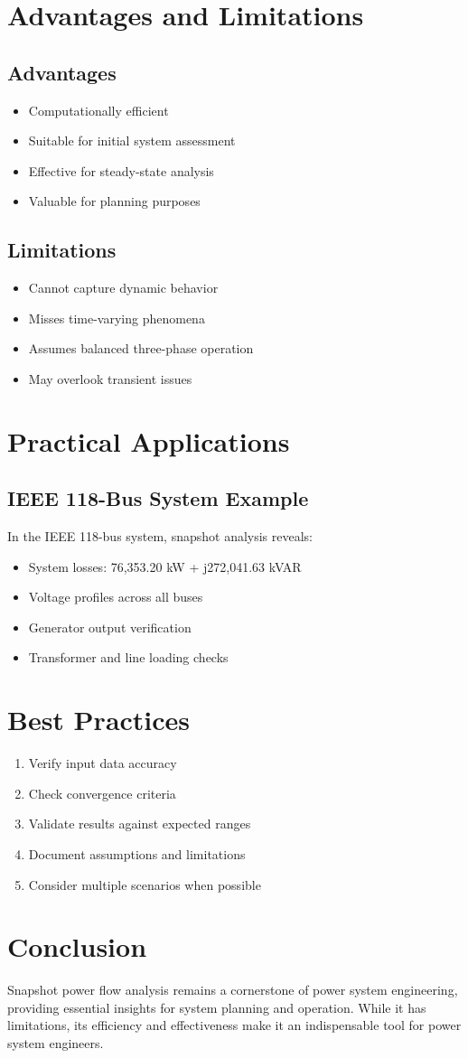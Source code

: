 \documentclass[11pt]{article}
\begin{document}
\section{Advantages and Limitations}
\subsection{Advantages}
\begin{itemize}
    \item Computationally efficient
    \item Suitable for initial system assessment
    \item Effective for steady-state analysis
    \item Valuable for planning purposes
\end{itemize}

\subsection{Limitations}
\begin{itemize}
    \item Cannot capture dynamic behavior
    \item Misses time-varying phenomena
    \item Assumes balanced three-phase operation
    \item May overlook transient issues
\end{itemize}

\section{Practical Applications}
\subsection{IEEE 118-Bus System Example}
In the IEEE 118-bus system, snapshot analysis reveals:
\begin{itemize}
    \item System losses: 76,353.20 kW + j272,041.63 kVAR
    \item Voltage profiles across all buses
    \item Generator output verification
    \item Transformer and line loading checks
\end{itemize}

\section{Best Practices}
\begin{enumerate}
    \item Verify input data accuracy
    \item Check convergence criteria
    \item Validate results against expected ranges
    \item Document assumptions and limitations
    \item Consider multiple scenarios when possible
\end{enumerate}

\section{Conclusion}
Snapshot power flow analysis remains a cornerstone of power system engineering, providing essential insights for system planning and operation. While it has limitations, its efficiency and effectiveness make it an indispensable tool for power system engineers.
\end{document}
